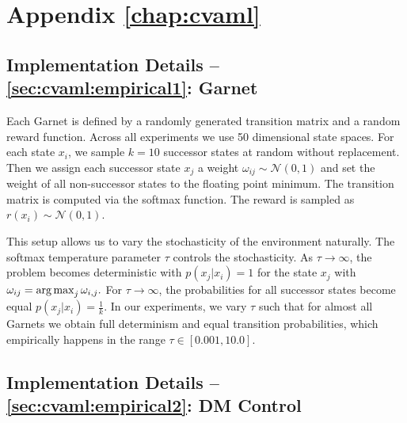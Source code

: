 \chapter{Appendix \autoref{chap:cvaml}}

\section{Implementation Details -- \autoref{sec:cvaml:empirical1}: Garnet}
\label{app:cvaml:model_design}

Each Garnet is defined by a randomly generated transition matrix and a random reward function.
Across all experiments we use 50 dimensional state spaces.
For each state $x_i$, we sample $k=10$ successor states at random without replacement.
Then we assign each successor state $x_j$ a weight $\omega_{ij} \sim \mathcal{N}(0, 1)$ and set the weight of all non-successor states to the floating point minimum.
The transition matrix is computed via the softmax function.
The reward is sampled as $r(x_i) \sim \mathcal{N}(0,1).$

This setup allows us to vary the stochasticity of the environment naturally.
The softmax temperature parameter $\tau$ controls the stochasticity.
As $\tau \rightarrow \infty$, the problem becomes deterministic with $p(x_j|x_i) = 1$ for the state $x_j$ with $\omega_{ij} = \operatorname*{arg\,max}_j \omega_{i,j}.$
For $\tau \rightarrow \infty$, the probabilities for all successor states become equal $p(x_j|x_i) = \frac{1}{k}.$
In our experiments, we vary $\tau$ such that for almost all Garnets we obtain full determinism and equal transition probabilities, which empirically happens in the range $\tau \in [0.001, 10.0].$

\section{Implementation Details --  \autoref{sec:cvaml:empirical2}: DM Control}
\label{app:model_design}

